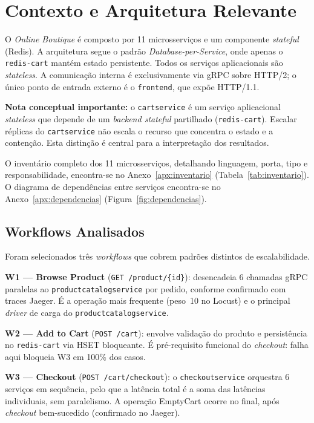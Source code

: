 \documentclass[manuscript,screen,review]{acmart}
\begin{document}
\section{Contexto e Arquitetura Relevante}

O \textit{Online Boutique} é composto por 11 microsserviços e um componente \textit{stateful} (Redis). A arquitetura segue o padrão \textit{Database-per-Service}, onde apenas o \texttt{redis-cart} mantém estado persistente. Todos os serviços aplicacionais são \textit{stateless}. A comunicação interna é exclusivamente via gRPC sobre HTTP/2; o único ponto de entrada externo é o \texttt{frontend}, que expõe HTTP/1.1.

\textbf{Nota conceptual importante:} o \texttt{cartservice} é um serviço aplicacional \textit{stateless} que depende de um \textit{backend stateful} partilhado (\texttt{redis-cart}). Escalar réplicas do \texttt{cartservice} não escala o recurso que concentra o estado e a contenção. Esta distinção é central para a interpretação dos resultados.

O inventário completo dos 11 microsserviços, detalhando linguagem, porta, tipo e responsabilidade, encontra-se no Anexo~\ref{apx:inventario} (Tabela~\ref{tab:inventario}). O diagrama de dependências entre serviços encontra-se no Anexo~\ref{apx:dependencias} (Figura~\ref{fig:dependencias}).

\subsection{Workflows Analisados}

Foram selecionados três \textit{workflows} que cobrem padrões distintos de escalabilidade.

\textbf{W1 — Browse Product} (\texttt{GET /product/\{id\}}): desencadeia 6 chamadas gRPC paralelas ao \texttt{productcatalogservice} por pedido, conforme confirmado com traces Jaeger. É a operação mais frequente (peso~10 no Locust) e o principal \textit{driver} de carga do \texttt{productcatalogservice}.

\textbf{W2 — Add to Cart} (\texttt{POST /cart}): envolve validação do produto e persistência no \texttt{redis-cart} via HSET bloqueante. É pré-requisito funcional do \textit{checkout}: falha aqui bloqueia W3 em 100\% dos casos.

\textbf{W3 — Checkout} (\texttt{POST /cart/checkout}): o \texttt{checkoutservice} orquestra 6 serviços em sequência, pelo que a latência total é a soma das latências individuais, sem paralelismo. A operação EmptyCart ocorre no final, após \textit{checkout} bem-sucedido (confirmado no Jaeger).
\end{document}
